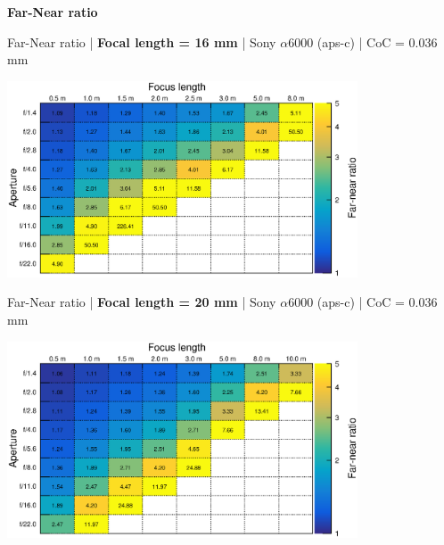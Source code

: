 \documentclass[aspectratio=169]{beamer}
\begin{document}

\begin{frame}[plain]{}
  \vspace{3ex}
  \begin{center} \LARGE \bf
    Far-Near ratio
  \end{center}
\end{frame}

\begin{frame}[plain]{}
  \vspace{1ex}
  \centering
  Far-Near ratio | {\bf Focal length = 16 mm} |  Sony $\alpha$\hspace{0.1em}6000 (aps-c) | CoC = 0.036 mm
  
  \includegraphics[center,width=0.78\textwidth]{img/far-near-ratio_focl16.eps}
\end{frame}

\begin{frame}[plain]{}
  \vspace{1ex}
  \centering
  Far-Near ratio | {\bf Focal length = 20 mm} |  Sony $\alpha$\hspace{0.1em}6000 (aps-c) | CoC = 0.036 mm
  
  \includegraphics[center,width=0.78\textwidth]{img/far-near-ratio_focl20.eps}
\end{frame}
\end{document}
